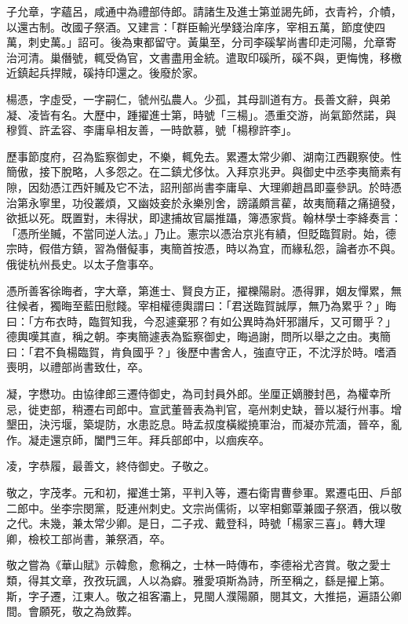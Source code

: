 \begin{pinyinscope}
 子允章，字蘊呂，咸通中為禮部侍郎。請諸生及進士第並謁先師，衣青衿，介幘，以還古制。改國子祭酒。又建言：「群臣輸光學錢治庠序，宰相五萬，節度使四萬，刺史萬。」詔可。後為東都留守。黃巢至，分司李磎挈尚書印走河陽，允章寄治河清。巢僭號，輒受偽官，文書盡用金統。遣取印磎所，磎不與，更悔愧，移檄近鎮起兵捍賊，磎持印還之。後廢於家。



 楊憑，字虛受，一字嗣仁，虢州弘農人。少孤，其母訓道有方。長善文辭，與弟凝、凌皆有名。大歷中，踵擢進士第，時號「三楊」。憑重交游，尚氣節然諾，與穆質、許孟容、李庸阜相友善，一時歆慕，號「楊穆許李」。



 歷事節度府，召為監察御史，不樂，輒免去。累遷太常少卿、湖南江西觀察使。性簡傲，接下脫略，人多怨之。在二鎮尤侈忲。入拜京兆尹。與御史中丞李夷簡素有隙，因劾憑江西奸贓及它不法，詔刑部尚書李庸阜、大理卿趙昌即臺參訊。於時憑治第永寧里，功役叢煩，又幽妓妾於永樂別舍，謗議頗言雚，故夷簡藉之痛擿發，欲抵以死。既置對，未得狀，即逮捕故官屬推躡，簿憑家貲。翰林學士李絳奏言：「憑所坐贓，不當同逆人法。」乃止。憲宗以憑治京兆有績，但貶臨賀尉。始，德宗時，假借方鎮，習為僭儗事，夷簡首按憑，時以為宜，而緣私怨，論者亦不與。俄徙杭州長史。以太子詹事卒。



 憑所善客徐晦者，字大章，第進士、賢良方正，擢櫟陽尉。憑得罪，姻友憚累，無往候者，獨晦至藍田慰餞。宰相權德輿謂曰：「君送臨賀誠厚，無乃為累乎？」晦曰：「方布衣時，臨賀知我，今忍遽棄邪？有如公異時為奸邪譖斥，又可爾乎？」德輿嘆其直，稱之朝。李夷簡遽表為監察御史，晦過謝，問所以舉之之由。夷簡曰：「君不負楊臨賀，肯負國乎？」後歷中書舍人，強直守正，不沈浮於時。嗜酒喪明，以禮部尚書致仕，卒。



 凝，字懋功。由協律郎三遷侍御史，為司封員外郎。坐厘正嫡媵封邑，為權幸所忌，徙吏部，稍遷右司郎中。宣武董晉表為判官，亳州刺史缺，晉以凝行州事。增墾田，決污堰，築堤防，水患訖息。時孟叔度橫縱撓軍治，而凝亦荒湎，晉卒，亂作。凝走還京師，闔門三年。拜兵部郎中，以痼疾卒。



 凌，字恭履，最善文，終侍御史。子敬之。



 敬之，字茂孝。元和初，擢進士第，平判入等，遷右衛胄曹參軍。累遷屯田、戶部二郎中。坐李宗閔黨，貶連州刺史。文宗尚儒術，以宰相鄭覃兼國子祭酒，俄以敬之代。未幾，兼太常少卿。是日，二子戎、戴登科，時號「楊家三喜」。轉大理卿，檢校工部尚書，兼祭酒，卒。



 敬之嘗為《華山賦》示韓愈，愈稱之，士林一時傳布，李德裕尤咨賞。敬之愛士類，得其文章，孜孜玩諷，人以為癖。雅愛項斯為詩，所至稱之，繇是擢上第。斯，字子遷，江東人。敬之祖客灞上，見閩人濮陽願，閱其文，大推挹，遍語公卿間。會願死，敬之為斂葬。




\end{pinyinscope}
